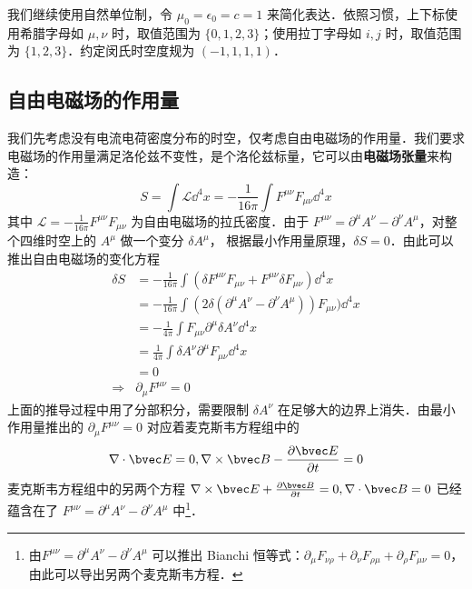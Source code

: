 

我们继续使用自然单位制，令 $\mu_0=\epsilon_0=c=1$ 来简化表达．依照习惯，上下标使用希腊字母如 $\mu, \nu$ 时，取值范围为 $\{0, 1, 2, 3\}$；使用拉丁字母如 $i, j$ 时，取值范围为 $\{1, 2, 3\}$．约定闵氏时空度规为 $(-1,1,1,1)$．

\subsection{自由电磁场的作用量}
我们先考虑没有电流电荷密度分布的时空，仅考虑自由电磁场的作用量．我们要求电磁场的作用量满足洛伦兹不变性，是个洛伦兹标量，它可以由\textbf{电磁场张量}来构造：
\begin{equation}\label{ElecS_eq1}
S=\int {\mathcal L} {\dd}^4 x=-\frac{1}{16\pi}\int F^{\mu\nu}F_{\mu\nu}{\dd}^4 x 
\end{equation}
其中 $\mathcal L=-\frac{1}{16\pi}F^{\mu\nu}F_{\mu\nu}$ 为自由电磁场的拉氏密度．由于 $F^{\mu\nu}=\partial^\mu A^\nu -\partial^\nu A^\mu$，对整个四维时空上的 $A^\mu$ 做一个变分 $\delta A^\mu$，
根据最小作用量原理，$\delta S=0$．由此可以推出自由电磁场的变化方程
\begin{equation}
\begin{aligned}
\delta S&=-\frac{1}{16\pi}\int (\delta F^{\mu\nu}F_{\mu\nu}+F^{\mu\nu}\delta F_{\mu\nu}){\dd}^4 x\\
&=-\frac{1}{16\pi}\int (2\delta (\partial^\mu A^\nu-\partial^\nu A^\mu)) F_{\mu\nu}){\dd}^4 x\\
&=-\frac{1}{4\pi}\int F_{\mu\nu}\partial^\mu \delta A^\nu {\dd}^4 x\\
&=\frac{1}{4\pi}\int \delta A^\nu\partial^\mu F_{\mu\nu} {\dd}^4 x \\
&=0\\
\Rightarrow &\partial_\mu F^{\mu\nu}=0
\end{aligned}
\end{equation}
上面的推导过程中用了分部积分，需要限制 $\delta A^\nu$ 在足够大的边界上消失．由最小作用量推出的 $\partial_\mu F^{\mu\nu}=0$ 对应着麦克斯韦方程组中的
\begin{equation}
\nabla\cdot \bvec E=0,\nabla\times \bvec B-\frac{\partial \bvec E}{\partial t}=0
\end{equation}
麦克斯韦方程组中的另两个方程 $\nabla\times \bvec E+\frac{\partial \bvec B}{\partial t}=0,\nabla\cdot \bvec B=0$ 已经蕴含在了 $F^{\mu\nu}=\partial^\mu A^\nu-\partial^\nu A^\mu$ 中\footnote{由$F^{\mu\nu}=\partial^\mu A^\nu-\partial^\nu A^\mu$ 可以推出 Bianchi 恒等式：$\partial_{\mu}F_{\nu\rho}+\partial_{\nu}F_{\rho\mu}+\partial_{\rho}F_{\mu\nu}=0$，由此可以导出另两个麦克斯韦方程．}．

